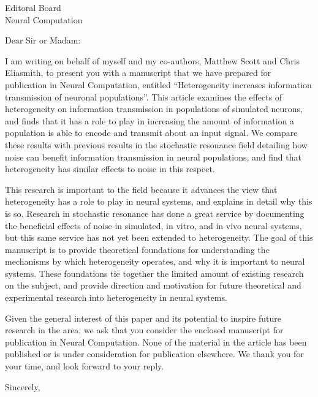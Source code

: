 \documentclass[]{letter}
\date{\today}
\begin{document}
\begin{letter}{Editoral Board\\Neural Computation}
\opening{Dear Sir or Madam:}

I am writing on behalf of myself and my co-authors, Matthew Scott and Chris Eliasmith, to present you with a manuscript that we have prepared for publication in Neural Computation, entitled ``Heterogeneity increases information transmission of neuronal populations''. This article examines the effects of heterogeneity on information transmission in populations of simulated neurons, and finds that it has a role to play in increasing the amount of information a population is able to encode and transmit about an input signal. We compare these results with previous results in the stochastic resonance field detailing how noise can benefit information transmission in neural populations, and find that heterogeneity has similar effects to noise in this respect.

This research is important to the field because it advances the view that heterogeneity has a role to play in neural systems, and explains in detail why this is so. Research in stochastic resonance has done a great service by documenting the beneficial effects of noise in simulated, in vitro, and in vivo neural systems, but this same service has not yet been extended to heterogeneity. The goal of this manuscript is to provide theoretical foundations for understanding the mechanisms by which heterogeneity operates, and why it is important to neural systems. These foundations tie together the limited amount of existing research on the subject, and provide direction and motivation for future theoretical and experimental research into heterogeneity in neural systems.

Given the general interest of this paper and its potential to inspire future research in the area, we ask that you consider the enclosed manuscript for publication in Neural Computation. None of the material in the article has been published or is under consideration for publication elsewhere. We thank you for your time, and look forward to your reply.

\closing{Sincerely,}
 
\end{letter}
\end{document}
